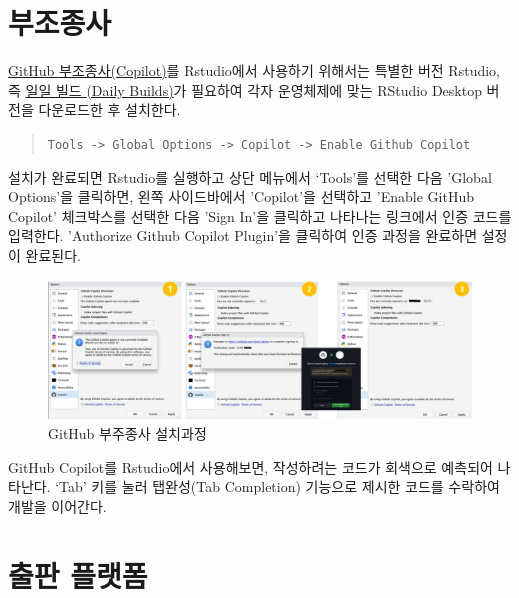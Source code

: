 \documentclass[
  letterpaper,
]{book}
\begin{document}
\hypertarget{uxbd80uxc870uxc885uxc0ac}{%
\section{부조종사}\label{uxbd80uxc870uxc885uxc0ac}}

\href{https://github.com/features/copilot}{GitHub 부조종사(Copilot)}를
Rstudio에서 사용하기 위해서는 특별한 버전 Rstudio, 즉
\href{https://dailies.rstudio.com/}{일일 빌드 (Daily Builds)}가 필요하여
각자 운영체제에 맞는 RStudio Desktop 버전을 다운로드한 후 설치한다.

\begin{quote}
\texttt{Tools\ -\textgreater{}\ Global\ Options\ -\textgreater{}\ Copilot\ -\textgreater{}\ Enable\ Github\ Copilot}
\end{quote}

설치가 완료되면 Rstudio를 실행하고 상단 메뉴에서 `Tools'를 선택한 다음
'Global Options'을 클릭하면, 왼쪽 사이드바에서 'Copilot'을 선택하고
'Enable GitHub Copilot' 체크박스를 선택한 다음 'Sign In'을 클릭하고
나타나는 링크에서 인증 코드를 입력한다. 'Authorize Github Copilot
Plugin'을 클릭하여 인증 과정을 완료하면 설정이 완료된다.

\begin{figure}

{\centering \includegraphics{images/rstudio_copilot.jpg}

}

\caption{GitHub 부주종사 설치과정}

\end{figure}

GitHub Copilot를 Rstudio에서 사용해보면, 작성하려는 코드가 회색으로
예측되어 나타난다. `Tab' 키를 눌러 탭완성(Tab Completion) 기능으로
제시한 코드를 수락하여 개발을 이어간다.

\hypertarget{uxcd9cuxd310-uxd50cuxb7abuxd3fc}{%
\section{출판 플랫폼}\label{uxcd9cuxd310-uxd50cuxb7abuxd3fc}}
\end{document}
